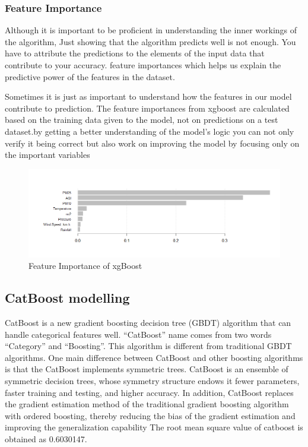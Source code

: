 \subsubsection{Feature Importance}
Although it is important to be proficient in
understanding the inner workings of the
algorithm, Just showing that the algorithm
predicts well is not enough. You have to attribute
the predictions to the elements of the input data
that contribute to your accuracy. feature
importances which helps us explain the predictive
power of the features in the dataset.\par
 Sometimes it
is just as important to understand how the features
in our model contribute to prediction. The feature
importances from xgboost are	
calculated based on the training data given to the
model, not on predictions on a test dataset.by
getting a better understanding of the model’s
logic you can not only verify it being correct but
also work on improving the model by focusing
only on the important variables
\begin{figure}[h]
\label{bd}
\centering
\includegraphics[width= 15 cm]{xgbimp.png}
\caption{Feature Importance of xgBoost}
\end{figure}

\subsection{CatBoost modelling}
CatBoost is a new gradient boosting decision tree (GBDT) algorithm that can handle categorical features well. “CatBoost” name comes from two words “Category” and “Boosting”. This algorithm is different from traditional GBDT algorithms. One main difference between CatBoost and other boosting algorithms is that the CatBoost implements symmetric trees.
   CatBoost is an ensemble of symmetric decision trees, whose symmetry structure endows it fewer parameters, faster training and testing, and higher accuracy. In addition, CatBoost replaces the gradient estimation method of the traditional gradient boosting algorithm with ordered boosting, thereby reducing the bias of the gradient estimation and improving the generalization capability
The root mean square value of catboost is obtained as 0.6030147.\pagebreak

